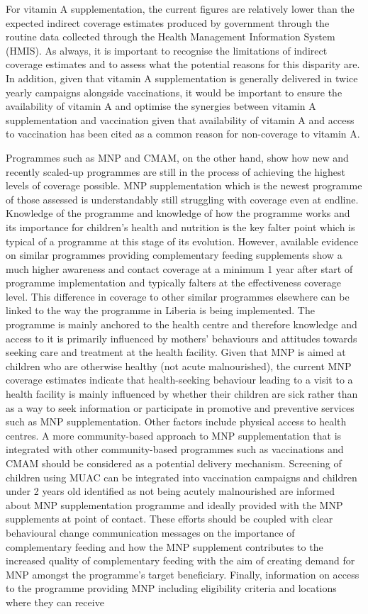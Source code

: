 \documentclass[12pt,a4paper]{article}
\begin{document}
For vitamin A supplementation, the current figures are relatively lower than the expected indirect coverage estimates produced by government through the routine data collected through the Health Management Information System (HMIS). As always, it is important to recognise the limitations of indirect coverage estimates and to assess what the potential reasons for this disparity are. In addition, given that vitamin A supplementation is generally delivered in twice yearly campaigns alongside vaccinations, it would be important to ensure the availability of vitamin A and optimise the synergies between vitamin A supplementation and vaccination given that availability of vitamin A and access to vaccination has been cited as a common reason for non-coverage to vitamin A.

Programmes such as MNP and CMAM, on the other hand, show how new and recently scaled-up programmes are still in the process of achieving the highest levels of coverage possible. MNP supplementation which is the newest programme of those assessed is understandably still struggling with coverage even at endline. Knowledge of the programme and knowledge of how the programme works and its importance for children's health and nutrition is the key falter point which is typical of a programme at this stage of its evolution. However, available evidence on similar programmes providing complementary feeding supplements show a much higher awareness and contact coverage at a minimum 1 year after start of programme implementation \citep{Aaron:2016cv} and typically falters at the effectiveness coverage level. This difference in coverage to other similar programmes elsewhere can be linked to the way the programme in Liberia is being implemented. The programme is mainly anchored to the health centre and therefore knowledge and access to it is primarily influenced by mothers' behaviours and attitudes towards seeking care and treatment at the health facility. Given that MNP is aimed at children who are otherwise healthy (not acute malnourished), the current MNP coverage estimates indicate that health-seeking behaviour leading to a visit to a health facility is mainly influenced by whether their children are sick rather than as a way to seek information or participate in promotive and preventive services such as MNP supplementation. Other factors include physical access to health centres. A more community-based approach to MNP supplementation that is integrated with other community-based programmes such as vaccinations and CMAM should be considered as a potential delivery mechanism. Screening of children using MUAC can be integrated into vaccination campaigns and children under 2 years old identified as not being acutely malnourished are informed about MNP supplementation programme and ideally provided with the MNP supplements at point of contact. These efforts should be coupled with clear behavioural change communication messages on the importance of complementary feeding and how the MNP supplement contributes to the increased quality of complementary feeding with the aim of creating demand for MNP amongst the programme's target beneficiary. Finally, information on access to the programme providing MNP including eligibility criteria and locations where they can receive 
\end{document}

